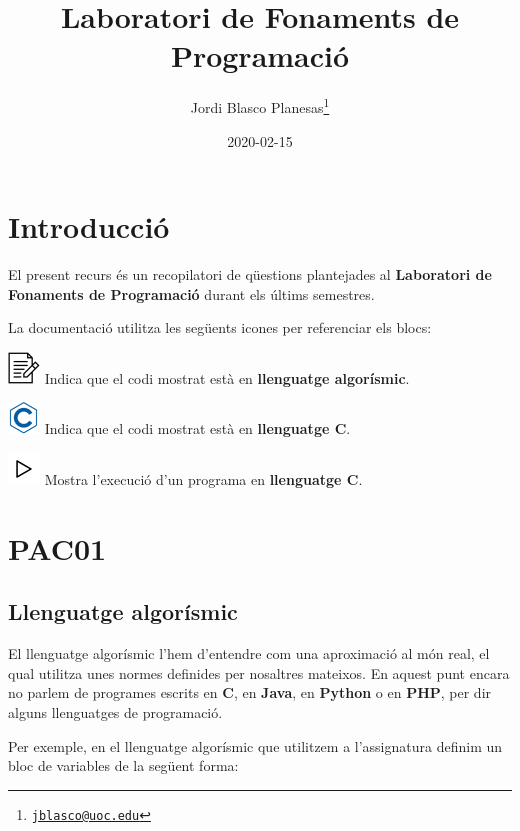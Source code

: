 \documentclass[]{book}
\title{Laboratori de Fonaments de Programació}
\author{Jordi Blasco Planesas\footnote{\href{mailto:jblasco@uoc.edu}{\nolinkurl{jblasco@uoc.edu}}}}
\date{2020-02-15}
\begin{document}
\maketitle

{
\setcounter{tocdepth}{1}
\tableofcontents
}
\chapter{Introducció}\label{introduccio}

El present recurs és un recopilatori de qüestions plantejades al
\textbf{Laboratori de Fonaments de Programació} durant els últims
semestres.

La documentació utilitza les següents icones per referenciar els blocs:

\includegraphics{./img/alg.png} Indica que el codi mostrat està en
\textbf{llenguatge algorísmic}.

\includegraphics{./img/c.png} Indica que el codi mostrat està en
\textbf{llenguatge C}.

\includegraphics{./img/play.png} Mostra l'execució d'un programa en
\textbf{llenguatge C}.

\chapter{PAC01}\label{pac01}

\section{Llenguatge algorísmic}\label{llenguatge-algorismic}

El llenguatge algorísmic l'hem d'entendre com una aproximació al món
real, el qual utilitza unes normes definides per nosaltres mateixos. En
aquest punt encara no parlem de programes escrits en \textbf{C}, en
\textbf{Java}, en \textbf{Python} o en \textbf{PHP}, per dir alguns
llenguatges de programació.

Per exemple, en el llenguatge algorísmic que utilitzem a l'assignatura
definim un bloc de variables de la següent forma:
\end{document}
